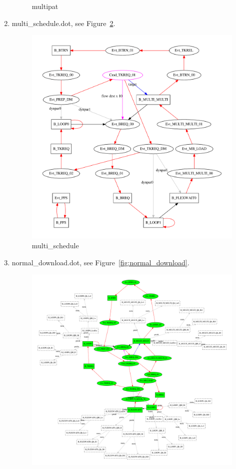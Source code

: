 \documentclass[12pt,a4paper]{report}
\begin{document}
\begin{enumerate}
\begin{figure}
        \caption{multipat}
        \label{fig:multipat}
    \end{figure}
\item multi\_schedule.dot, see Figure~\ref{fig:multi_schedule}.
    \begin{figure}
        \centering 
        \includegraphics*[width=1.0\textwidth,keepaspectratio]{TestPattern/multi_schedule.pdf}
        \caption{multi\_schedule}
        \label{fig:multi_schedule}
    \end{figure}
\item normal\_download.dot, see Figure~\ref{fig:normal_download}.
    \begin{figure}
        \centering 
        \includegraphics*[width=1.0\textwidth,keepaspectratio]{TestPattern/normal_download.pdf}

\end{figure}
\end{enumerate}
\end{document}
